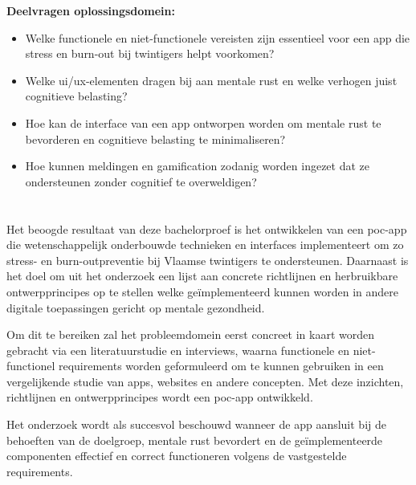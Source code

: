 \vspace{1em}

\textbf{Deelvragen oplossingsdomein:}

\begin{itemize}
    \item Welke functionele en niet-functionele vereisten zijn essentieel voor een app die stress en burn-out bij twintigers helpt voorkomen?
    \item Welke \acrshort{ui}/\acrshort{ux}-elementen dragen bij aan mentale rust en welke verhogen juist cognitieve belasting?
    \item Hoe kan de interface van een app ontworpen worden om mentale rust te bevorderen en cognitieve belasting te minimaliseren?
    \item Hoe kunnen meldingen en gamification zodanig worden ingezet dat ze ondersteunen zonder cognitief te overweldigen?
\end{itemize}

\newpage

\section{}%
\label{sec:onderzoeksdoelstelling}

\vspace{1em}

Het beoogde resultaat van deze bachelorproef is het ontwikkelen van een \acrshort{poc}-app die wetenschappelijk onderbouwde technieken en interfaces implementeert om zo stress- en burn-outpreventie bij Vlaamse twintigers te ondersteunen. Daarnaast is het doel om uit het onderzoek een lijst aan concrete richtlijnen en herbruikbare ontwerpprincipes op te stellen welke geïmplementeerd kunnen worden in andere digitale toepassingen gericht op mentale gezondheid.

\vspace{1em}

Om dit te bereiken zal het probleemdomein eerst concreet in kaart worden gebracht via een literatuurstudie en interviews, waarna functionele en niet-functionel requirements worden geformuleerd om te kunnen gebruiken in een vergelijkende studie van apps, websites en andere concepten. Met deze inzichten, richtlijnen en ontwerpprincipes wordt een \acrshort{poc}-app ontwikkeld.

\vspace{1em}

Het onderzoek wordt als succesvol beschouwd wanneer de app aansluit bij de behoeften van de doelgroep, mentale rust bevordert en de geïmplementeerde componenten effectief en correct functioneren volgens de vastgestelde requirements.

